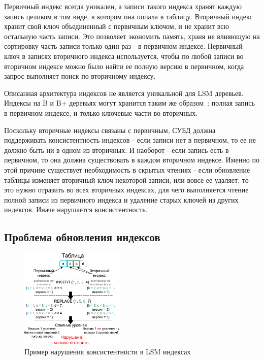 \documentclass[a4paper,hidelinks,12pt]{article}
\begin{document}
Первичный индекс всегда уникален, а записи такого индекса хранят каждую запись
целиком в том виде, в котором она попала в таблицу. Вторичный индекс хранит свой
ключ объединенный с первичным ключом, и не хранит всю остальную часть записи.
Это позволяет экономить память, храня не влияющую на сортировку часть записи
только один раз - в первичном индексе. Первичный ключ в записях вторичного
индекса используется, чтобы по любой записи во вторичном индексе можно было
найти ее полную версию в первичном, когда запрос выполняет поиск по вторичному
индексу.

Описанная архитектура индексов не является уникальной для LSM деревьев. Индексы
на B и B+ деревьях могут хранится таким же
образом~\cite{secondary-search, sqlite}: полная запись в первичном индексе, и
только ключевые части во вторичных.

Поскольку вторичные индексы связаны с первичным, СУБД должна поддерживать
консистентность индексов - если записи нет в первичном, то ее не должно быть ни
в одном из вторичных. И наоборот - если запись есть в первичном, то она должна
существовать в каждом вторичном индексе. Именно по этой причине существует
необходимость в скрытых чтениях - если обновление таблицы изменяет вторичный
ключ некоторой записи, или вовсе ее удаляет, то это нужно отразить во всех
вторичных индексах, для чего выполняется чтение полной записи из первичного
индекса и удаление старых ключей из других индексов. Иначе нарушается
консистентность.

\subsection{Проблема обновления индексов}

\begin{figure}
\centering
\includegraphics[width=0.45\textwidth]{inconsistent_example}
\caption{Пример нарушения консистентности в LSM индексах}
\label{fig:inconsistent_example}
\end{figure}
\end{document}

